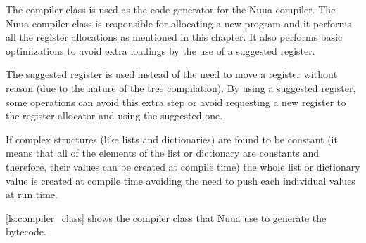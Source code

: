 The compiler class is used as the code generator for the Nuua compiler.
The Nuua compiler class is responsible for allocating a new program and it performs all the register allocations as
mentioned in this chapter. It also performs basic optimizations to avoid extra loadings by the use of a suggested register.

The suggested register is used instead of the need to move a register without reason (due to the nature of the tree compilation).
By using a suggested register, some operations can avoid this extra step or avoid requesting a new register to the register allocator
and using the suggested one.

If complex structures (like lists and dictionaries) are found to be constant (it means that all of the elements
of the list or dictionary are constants and therefore, their values can be created at compile time) the whole list or dictionary value is created
at compile time avoiding the need to push each individual values at run time.

\autoref{ls:compiler_class} shows the compiler class that Nuua use to generate the bytecode.\\

